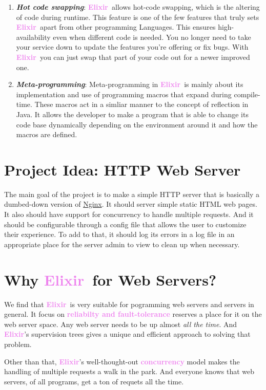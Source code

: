 \documentclass[12pt]{article}
\newcommand{\bb}[1]{\textbf{\textit{#1}}}
\newcommand{\vio}[1]{\textbf{\textcolor{violet}{#1}}}
\newcommand{\elix}{\vio{Elixir}}
\begin{document}
\begin{enumerate}[label= \roman*.]
    \item \bb{Hot code swapping}: \elix\ allows hot-code swapping, which is the altering of code during runtime. This feature is one of the few features that truly sets \elix\ apart from other programming Languages. This ensures high-availability even when different code is needed. You no longer need to take your service down to update the features you're offering or fix bugs. With \elix\, you can just swap that part of your code out for a newer improved one.

    \item \bb{Meta-programming}: Meta-programming in \elix\ is mainly about its implementation and use of programming macros that expand during compile-time. These macros act in a simliar manner to the concept of reflection in Java. It allows the developer to make a program that is able to change its code base dynamically depending on the environment around it and how the macros are defined.


\end{enumerate}
\newpage

\section{Project Idea: HTTP Web Server}
The main goal of the project is to make a simple HTTP server that is basically a dumbed-down version of \href{https://www.nginx.com/}{Nginx}. It should server simple static HTML web pages. It also should have support for concurrency to handle multiple requests. And it should be configurable through a config file that allows the user to customize their experience. To add to that, it should log its errors in a log file in an appropriate place for the server admin to view to clean up when necessary.

\section{Why \elix\ for Web Servers?}

We find that \elix\ is very suitable for pogramming web servers and servers in general. It focus on \vio{reliabilty and fault-tolerance} reserves a place for it on the web server space. Any web server needs to be up almost \textit{all the time}. And \elix's supervision trees gives a unique and efficient approach to solving that problem. \par

Other than that, \elix's well-thought-out \vio{concurrency} model makes the handling of multiple requests a walk in the park. And everyone knows that web servers, of all programs, get a ton of requets all the time. \par
\end{document}
